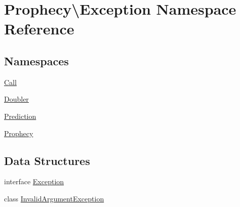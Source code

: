 \hypertarget{namespace_prophecy_1_1_exception}{}\section{Prophecy\textbackslash{}Exception Namespace Reference}
\label{namespace_prophecy_1_1_exception}
\subsection*{Namespaces}
\begin{DoxyCompactItemize}
\item 
 \mbox{\hyperlink{namespace_prophecy_1_1_exception_1_1_call}{Call}}
\item 
 \mbox{\hyperlink{namespace_prophecy_1_1_exception_1_1_doubler}{Doubler}}
\item 
 \mbox{\hyperlink{namespace_prophecy_1_1_exception_1_1_prediction}{Prediction}}
\item 
 \mbox{\hyperlink{namespace_prophecy_1_1_exception_1_1_prophecy}{Prophecy}}
\end{DoxyCompactItemize}
\subsection*{Data Structures}
\begin{DoxyCompactItemize}
\item 
interface \mbox{\hyperlink{interface_prophecy_1_1_exception_1_1_exception}{Exception}}
\item 
class \mbox{\hyperlink{class_prophecy_1_1_exception_1_1_invalid_argument_exception}{Invalid\+Argument\+Exception}}
\end{DoxyCompactItemize}
